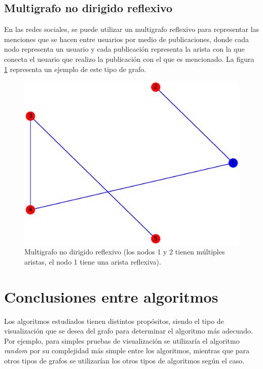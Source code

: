 \documentclass{article}
\begin{document}
\subsection{Multigrafo no dirigido reflexivo}
En las redes sociales, se puede utilizar un multigrafo reflexivo para representar las menciones que se hacen entre usuarios por medio de publicaciones, donde cada nodo representa un usuario y cada publicación representa la arista con la que conecta el usuario que realizo la publicación con el que es mencionado. La figura \ref{fig:MNDR} representa un ejemplo de este tipo de grafo.
\begin{figure}[H]
    \includegraphics[width=\textwidth]{9-MNDR}
    \caption{Multigrafo no dirigido reflexivo (los nodos 1 y 2 tienen múltiples aristas, el nodo 1 tiene una arista reflexiva).}
    \label{fig:MNDR}
\end{figure}

\section{Conclusiones entre algoritmos}
Los algoritmos estudiados tienen distintos propósitos, siendo el tipo de visualización que se desea del grafo para determinar el algoritmo más adecuado. Por ejemplo, para simples pruebas de visualización se utilizaría el algoritmo \textit{random} por su complejidad más simple entre los algoritmos, mientras que para otros tipos de grafos se utilizarían los otros tipos de algoritmos según el caso.



\end{document}
